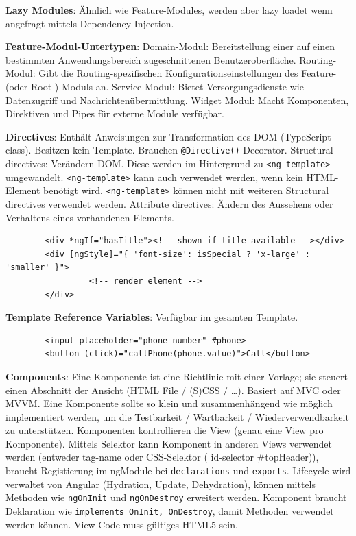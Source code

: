 \documentclass[10pt,landscape]{article}
\begin{document}
\begin{multicols}{2}
        \textbf{Lazy Modules}: Ähnlich wie Feature-Modules, werden aber lazy loadet wenn angefragt mittels Dependency Injection.

        \textbf{Feature-Modul-Untertypen}: Domain-Modul: Bereitstellung einer auf einen bestimmten Anwendungsbereich zugeschnittenen Benutzeroberfläche.
        Routing-Modul: Gibt die Routing-spezifischen Konfigurationseinstellungen des Feature- (oder Root-) Moduls an.
        Service-Modul: Bietet Versorgungsdienste wie Datenzugriff und Nachrichtenübermittlung.
        Widget Modul: Macht Komponenten, Direktiven und Pipes für externe Module verfügbar.

        \textbf{Directives}: Enthält Anweisungen zur Transformation des DOM (TypeScript class).
        Besitzen kein Template.
        Brauchen \lstinline{@Directive()}-Decorator.
        Structural directives: Verändern DOM.
        Diese werden im Hintergrund zu \lstinline{<ng-template>} umgewandelt.
        \lstinline{<ng-template>} kann auch verwendet werden, wenn kein HTML-Element benötigt wird.
        \lstinline{<ng-template>} können nicht mit weiteren Structural directives verwendet werden.
        Attribute directives: Ändern des Aussehens oder Verhaltens eines vorhandenen Elements.

        \begin{lstlisting}
        <div *ngIf="hasTitle"><!-- shown if title available --></div>
        <div [ngStyle]="{ 'font-size': isSpecial ? 'x-large' : 'smaller' }">
                 <!-- render element -->
        </div>
        \end{lstlisting}

        \textbf{Template Reference Variables}: Verfügbar im gesamten Template.

        \begin{lstlisting}
        <input placeholder="phone number" #phone>
        <button (click)="callPhone(phone.value)">Call</button>
        \end{lstlisting}

        \textbf{Components}: Eine Komponente ist eine Richtlinie mit einer Vorlage; sie steuert einen Abschnitt der Ansicht (HTML File / (S)CSS / \ldots).
        Basiert auf MVC oder MVVM.
        Eine Komponente sollte so klein und zusammenhängend wie möglich implementiert werden, um die Testbarkeit / Wartbarkeit / Wiederverwendbarkeit zu unterstützen.
        Komponenten kontrollieren die View (genau eine View pro Komponente).
        Mittels Selektor kann Komponent in anderen Views verwendet werden (entweder tag-name oder CSS-Selektor ( id-selector \#topHeader)), braucht Registierung im ngModule bei \lstinline{declarations} und \lstinline{exports}.
        Lifecycle wird verwaltet von Angular (Hydration, Update, Dehydration), können mittels Methoden wie \lstinline{ngOnInit} und \lstinline{ngOnDestroy} erweitert werden.
        Komponent braucht Deklaration wie \lstinline{implements OnInit, OnDestroy}, damit Methoden verwendet werden können.
        View-Code muss gültiges HTML5 sein.


\end{multicols}
\end{document}

